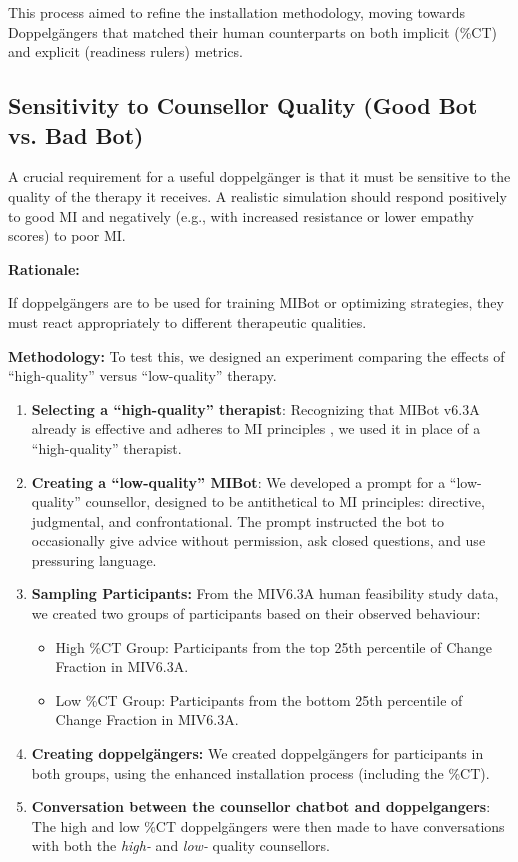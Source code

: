 This process aimed to refine the installation methodology, moving towards Doppelgängers that matched their human counterparts on both implicit (\%CT) and explicit (readiness rulers) metrics.

\subsection{Sensitivity to Counsellor Quality (Good Bot vs. Bad Bot)}
A crucial requirement for a useful doppelgänger is that it must be sensitive to the quality of the therapy it receives. A realistic simulation should respond positively to good MI and negatively (e.g., with increased resistance or lower empathy scores) to poor MI.

\textbf{Rationale:}

If doppelgängers are to be used for training MIBot or optimizing strategies, they must react appropriately to different therapeutic qualities.

\textbf{Methodology:}
To test this, we designed an experiment comparing the effects of ``high-quality'' versus ``low-quality'' therapy.

\begin{enumerate}
    \item \textbf{Selecting a ``high-quality'' therapist}: Recognizing that MIBot v6.3A already is effective and adheres to MI principles \cite{mahmood-etal-2025-fully}, we used it in place of a ``high-quality'' therapist.
    
    \item \textbf{Creating a ``low-quality'' MIBot}: We developed a prompt for a ``low-quality'' counsellor, designed to be antithetical to MI principles: directive, judgmental, and confrontational. The prompt instructed the bot to occasionally give advice without permission, ask closed questions, and use pressuring language.

    \item \textbf{Sampling Participants:} From the MIV6.3A human feasibility study data, we created two groups of participants based on their observed behaviour:

    \begin{itemize}
        \item High \%CT Group: Participants from the top 25th percentile of Change Fraction in MIV6.3A.
        \item Low \%CT Group: Participants from the bottom 25th percentile of Change Fraction in MIV6.3A.
    \end{itemize}



    \item \textbf{Creating doppelgängers:} We created doppelgängers for participants in both groups, using the enhanced installation process (including the \%CT).

    \item \textbf{Conversation between the counsellor chatbot and doppelgangers}: The high and low \%CT doppelgängers were then made to have conversations with both the \textit{high-} and \textit{low-} quality counsellors.
\end{enumerate}

